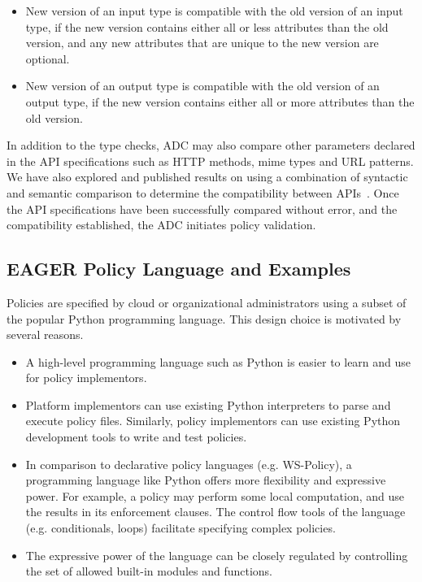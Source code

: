 \begin{itemize}
\item New version of an input type is compatible with the old version of an input type, 
if the new version contains either all or less attributes than the 
old version, and any new attributes that are unique to the new version are optional.
\item New version of an output type is compatible with the old version of an output type, 
if the new version contains either all or more attributes than the 
old version.
\end{itemize}

In addition to the type checks, ADC may also compare other parameters declared in the API specifications
such as HTTP methods, mime types and URL patterns. We have also explored and 
published results on using a combination of syntactic and semantic comparison
to determine the compatibility between APIs~\cite{6930607,jayathilaka2014using}.
Once the API specifications have been successfully compared without error, and 
the compatibility established, the ADC initiates policy validation. 

\subsection{EAGER Policy Language and Examples}
\label{sec:policy-lang}
Policies are specified by cloud
or organizational administrators using a subset of the popular 
Python programming language.
This design choice is motivated by several reasons.
\begin{itemize}
\item A high-level programming language such as Python is easier to learn and use
for policy implementors. 
\item Platform implementors can use existing Python interpreters to parse
and execute policy files. Similarly, policy implementors can use existing Python
development tools to write and test policies.
\item In comparison to declarative policy languages (e.g. WS-Policy),
a programming language like Python offers more flexibility and expressive power.
For example, a policy may perform some local computation, and use the results
in its enforcement clauses. The control flow tools of the language (e.g. conditionals, loops) 
facilitate specifying complex policies.
\item The expressive power of the language can be closely regulated by controlling
the set of allowed built-in modules and functions.
\end{itemize}

